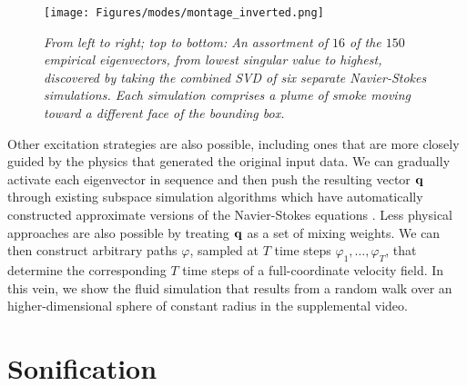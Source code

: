 \documentclass[11pt]{article}
\begin{document}
\begin{figure}
	\centering
	\texttt{[image: Figures/modes/montage\_inverted.png]}
	\caption{\em From left to right; top to bottom: An assortment of $16$ of the $150$ empirical eigenvectors, from lowest singular value to highest,  discovered by taking the combined SVD of six separate Navier-Stokes simulations. Each simulation comprises a plume of smoke moving toward a different face of the bounding box.}
	\label{fig:eigs}
\end{figure}

Other excitation strategies are also possible, including ones that are more closely guided by the physics that generated the original input data. We can gradually activate each eigenvector in sequence and then push the resulting vector $\mathbf{q}$ through existing subspace simulation algorithms which have automatically constructed approximate versions of the Navier-Stokes equations \cite{Kim2013}. Less physical approaches are also possible by treating $\mathbf{q}$ as a set of mixing weights. We can then construct arbitrary paths $\varphi$, sampled at $T$ time steps $\varphi_1, \ldots, \varphi_T$, that determine the corresponding $T$ time steps of a full-coordinate velocity field. In this vein, we show the fluid simulation that results from a random walk over an higher-dimensional sphere of constant radius in the supplemental video. 

\section*{Sonification}
\end{document}
